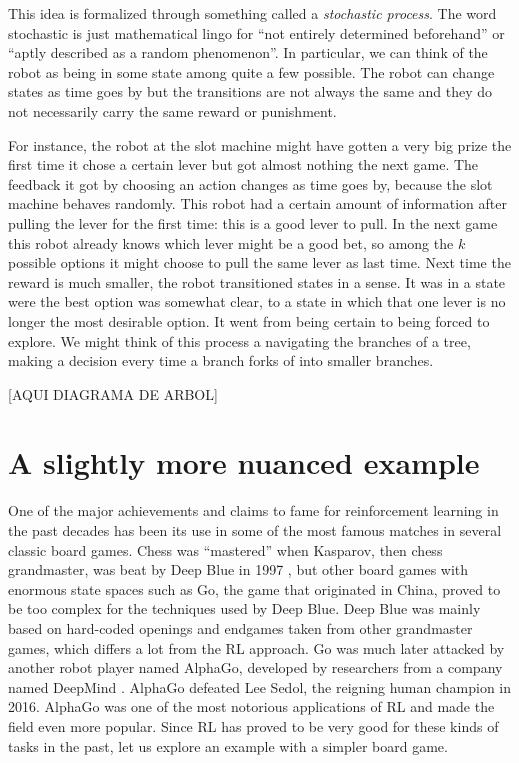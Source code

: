 This idea is formalized through something called a 
\textit{stochastic process}. The word stochastic is just 
mathematical lingo for ``not entirely determined beforehand'' 
or ``aptly described as a random phenomenon''.  In particular, 
we can think of the robot as being in some state among quite a 
few possible. The robot can change states as time goes by but 
the transitions are not always the same and they do not 
necessarily carry the same reward or punishment.

For instance, the robot at the slot machine might have gotten a 
very big prize the first time it chose a certain lever but got 
almost nothing the next game. The feedback it got by choosing 
an action changes as time goes by, because the slot machine 
behaves randomly. This robot had a certain amount of 
information after pulling the lever for the first time: this is 
a good lever to pull. In the next game this robot already knows 
which lever might be a good bet, so among the $k$ possible 
options it might choose to pull the same lever as last time. 
Next time the reward is much smaller, the robot transitioned 
states in a sense. It was in a state were the best option was 
somewhat clear, to a state in which that one lever is no longer 
the most desirable option. It went from being certain to being 
forced to explore. We might think of this process a navigating 
the branches of a tree, making a decision every time a branch 
forks of into smaller branches.

[AQUI DIAGRAMA DE ARBOL]

\section{A slightly more nuanced example}
One of the major achievements and claims to fame for 
reinforcement learning in the past decades has been its use in 
some of the most famous matches in several classic board games.  
Chess was ``mastered'' when Kasparov, then chess grandmaster, 
was beat by Deep Blue in 1997 \cite{silverchess}, but other 
board games with enormous state spaces such as Go, the game 
that originated in China, proved to be too complex for the 
techniques used by Deep Blue. Deep Blue was mainly based on 
hard-coded openings and endgames taken from other grandmaster 
games, which differs a lot from the RL approach. Go was much 
later attacked by another robot player named AlphaGo, developed 
by researchers from a company named DeepMind 
\cite{silver2017mastering}.  AlphaGo defeated Lee Sedol, the 
reigning human champion in 2016.  AlphaGo was one of the most 
notorious applications of RL and made the field even more 
popular. Since RL has proved to be very good for these kinds of 
tasks in the past, let us explore an example with a simpler 
board game.

